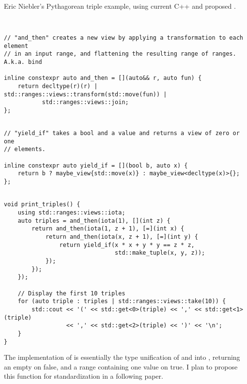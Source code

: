 \documentclass[a4paper,10pt,oneside,openany,final,article]{memoir}
\begin{document}
Eric Niebler's Pythagorean triple example, using current C++ and proposed .

\begin{minipage}[t]{\columnwidth}
  \begin{verbatim}


// "and_then" creates a new view by applying a transformation to each element
// in an input range, and flattening the resulting range of ranges. A.k.a. bind

inline constexpr auto and_then = [](auto&& r, auto fun) {
    return decltype(r)(r) | std::ranges::views::transform(std::move(fun)) |
           std::ranges::views::join;
};
\end{verbatim}
\end{minipage}

\begin{minipage}[t]{\columnwidth}
  \begin{verbatim}

// "yield_if" takes a bool and a value and returns a view of zero or one
// elements.

inline constexpr auto yield_if = [](bool b, auto x) {
    return b ? maybe_view{std::move(x)} : maybe_view<decltype(x)>{};
};
\end{verbatim}
\end{minipage}

\begin{minipage}[t]{\columnwidth}
  \begin{verbatim}

void print_triples() {
    using std::ranges::views::iota;
    auto triples = and_then(iota(1), [](int z) {
        return and_then(iota(1, z + 1), [=](int x) {
            return and_then(iota(x, z + 1), [=](int y) {
                return yield_if(x * x + y * y == z * z,
                                std::make_tuple(x, y, z));
            });
        });
    });

    // Display the first 10 triples
    for (auto triple : triples | std::ranges::views::take(10)) {
        std::cout << '(' << std::get<0>(triple) << ',' << std::get<1>(triple)
                  << ',' << std::get<2>(triple) << ')' << '\n';
    }
}

\end{verbatim}
\end{minipage}

The implementation of  is essentially the type unification of  and  into , returning an empty on false, and a range containing one value on true. I plan to propose this function for standardization in a following paper.
\end{document}

